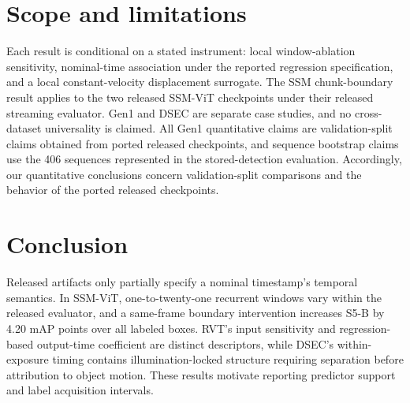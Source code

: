 \documentclass[10pt,twocolumn,letterpaper]{article}
\begin{document}
\section{Scope and limitations}

Each result is conditional on a stated instrument: local window-ablation sensitivity,
nominal-time association under the reported regression specification, and a local
constant-velocity displacement surrogate. The SSM chunk-boundary result applies to the two
released SSM-ViT checkpoints under their released streaming evaluator. Gen1 and DSEC are
separate case studies, and no cross-dataset universality is claimed. All Gen1 quantitative claims
are validation-split claims obtained from ported released checkpoints, and sequence bootstrap
claims use the 406 sequences represented in the stored-detection evaluation. Accordingly, our
quantitative conclusions concern validation-split comparisons and the behavior of the ported
released checkpoints.

\section{Conclusion}

Released artifacts only partially specify a nominal timestamp's temporal semantics. In SSM-ViT,
one-to-twenty-one recurrent windows vary within the released evaluator, and a same-frame boundary
intervention increases S5-B by 4.20 mAP points over all labeled boxes. RVT's input sensitivity
and regression-based output-time coefficient are distinct descriptors, while DSEC's
within-exposure timing contains illumination-locked structure requiring separation before
attribution to object motion. These results motivate reporting predictor support and label
acquisition intervals.
\end{document}
